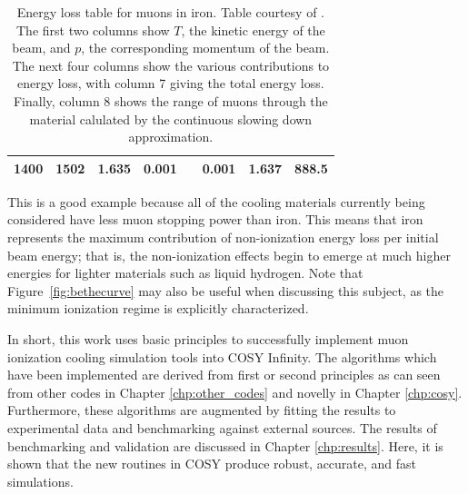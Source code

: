 \begin{table}
\begin{tabularx}{\textwidth}{cccccccc}
1400 & 1502 & 1.635  & 0.001 & & 0.001 	& 1.637 & 888.5\\
\hline
\end{tabularx}
\caption[Energy loss table for muons in iron. Table courtesy of \cite{PDGTables}.]{Energy loss table for muons in iron. Table courtesy of \cite{PDGTables}. The first two columns show $T$, the kinetic energy of the beam, and $p$, the corresponding momentum of the beam. The next four columns show the various contributions to energy loss, with column 7 giving the total energy loss. Finally, column 8 shows the range of muons through the material calulated by the continuous slowing down approximation.}
\label{tbl:elossfe}
\end{table}

This is a good example because all of the cooling materials currently being considered have less muon stopping power than iron. This means that iron represents the maximum contribution of non-ionization energy loss per initial beam energy; that is, the non-ionization effects begin to emerge at much higher energies for lighter materials such as liquid hydrogen. Note that Figure~\ref{fig:bethecurve} may also be useful when discussing this subject, as the minimum ionization regime is explicitly characterized.

\par

In short, this work uses basic principles to successfully implement muon ionization cooling simulation tools into COSY Infinity. The algorithms which have been implemented are derived from first or second principles as can seen from other codes in Chapter \ref{chp:other_codes} and novelly in Chapter \ref{chp:cosy}. Furthermore, these algorithms are augmented by fitting the results to experimental data and benchmarking against external sources. The results of benchmarking and validation are discussed in Chapter \ref{chp:results}. Here, it is shown that the new routines in COSY produce robust, accurate, and fast simulations.